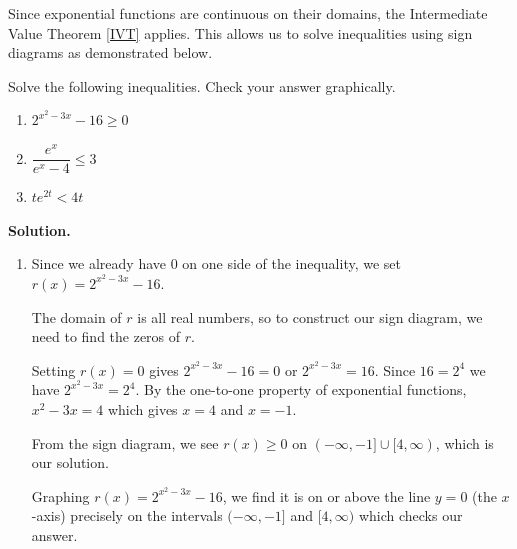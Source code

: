 \documentclass{ximera}
\begin{document}
Since exponential functions are continuous on their domains, the Intermediate Value Theorem \ref{IVT} applies. This allows us to solve inequalities using sign diagrams as demonstrated below.

\begin{example}  Solve the following inequalities.  Check your answer graphically.
\label{expineq}

\begin{multicols}{3}

\begin{enumerate}

\item \label{canuselogsex} $2^{x^2-3x} - 16 \geq 0$

\item  $\dfrac{e^{x}}{e^{x}-4} \leq 3$

\item  $t e^{2t} < 4t$

\end{enumerate}

\end{multicols}

\newpage

{\bf Solution.}

\begin{enumerate}

\item  Since we already have $0$ on one side of the inequality, we set $r(x) = 2^{x^2-3x} - 16$.  

\smallskip

The domain of $r$ is all real numbers, so to construct our sign diagram, we need to find the zeros of $r$.  

\smallskip

Setting $r(x) = 0$ gives $2^{x^2-3x} - 16 = 0$ or $2^{x^2-3x} = 16$.  Since $16 = 2^{4}$ we have $2^{x^2-3x} = 2^{4}$.   By the one-to-one property of exponential functions, $x^2 -3x = 4$ which gives $x=4$ and $x=-1$.  

\smallskip

From the sign diagram, we see $r(x) \geq 0$ on $(-\infty, -1] \cup [4, \infty)$, which is our solution.  

\smallskip

Graphing $r(x) = 2^{x^2-3x} - 16$,  we find it is on or above the line $y=0$ (the $x$-axis) precisely on the intervals  $(-\infty, -1]$ and $ [4, \infty)$ which checks our answer.

\begin{center}


\end{center}
\end{enumerate}
\end{example}
\end{document}
